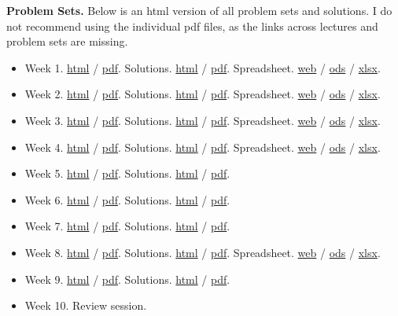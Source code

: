 \documentclass[]{book}
\providecommand{\tightlist}{%
  \setlength{\itemsep}{0pt}\setlength{\parskip}{0pt}}
\begin{document}
\textbf{Problem Sets.} Below is an html version of all problem sets and
solutions. I do not recommend using the individual pdf files, as the
links across lectures and problem sets are missing.

\begin{itemize}
\tightlist
\item
  Week 1. \href{pset1.html}{html} / \href{pset1.pdf}{pdf}. Solutions.
  \href{pset1-sol.html}{html} / \href{pset1-sol.pdf}{pdf}. Spreadsheet.
  \href{https://docs.google.com/spreadsheets/d/108I8xuosIQvgU6wOGrfwzHhE4p1OStgv8iIpzZ-4vME/edit?usp=sharing}{web}
  / \href{spreadsheets/pset1-sol.ods}{ods} /
  \href{spreadsheets/pset1-sol.xlsx}{xlsx}.
\item
  Week 2. \href{pset2.html}{html} / \href{pset2.pdf}{pdf}. Solutions.
  \href{pset2-sol.html}{html} / \href{pset2-sol.pdf}{pdf}. Spreadsheet.
  \href{https://docs.google.com/spreadsheets/d/1dkygwhDNT79cU_mTVXWal4RyGwX38OTnu5iS5UTz1fc/edit?usp=sharing}{web}
  / \href{spreadsheets/pset2-sol.ods}{ods} /
  \href{spreadsheets/pset2-sol.xlsx}{xlsx}.
\item
  Week 3. \href{pset3.html}{html} / \href{pset3.pdf}{pdf}. Solutions.
  \href{pset3-sol.html}{html} / \href{pset3-sol.pdf}{pdf}. Spreadsheet.
  \href{https://docs.google.com/spreadsheets/d/1dDFa5YZE5170Tv36klHQ19ykK2bP9wjeR0Y1_h-kacg/edit?usp=sharing}{web}
  / \href{spreadsheets/pset3-sol.ods}{ods} /
  \href{spreadsheets/pset3-sol.xlsx}{xlsx}.
\item
  Week 4. \href{pset4.html}{html} / \href{pset4.pdf}{pdf}. Solutions.
  \href{pset4-sol.html}{html} / \href{pset4-sol.pdf}{pdf}. Spreadsheet.
  \href{https://docs.google.com/spreadsheets/d/1h9JJD8K2_IE166gdj78waf0zu4YDY9Rp3r5oiJR_06s/edit?usp=sharing}{web}
  / \href{spreadsheets/pset4-sol.ods}{ods} /
  \href{spreadsheets/pset4-sol.xlsx}{xlsx}.
\item
  Week 5. \href{pset5.html}{html} / \href{pset5.pdf}{pdf}. Solutions.
  \href{pset5-sol.html}{html} / \href{pset5-sol.pdf}{pdf}.
\item
  Week 6. \href{pset6.html}{html} / \href{pset6.pdf}{pdf}. Solutions.
  \href{pset6-sol.html}{html} / \href{pset6-sol.pdf}{pdf}.
\item
  Week 7. \href{pset7.html}{html} / \href{pset7.pdf}{pdf}. Solutions.
  \href{pset7-sol.html}{html} / \href{pset7-sol.pdf}{pdf}.
\item
  Week 8. \href{pset8.html}{html} / \href{pset8.pdf}{pdf}. Solutions.
  \href{pset8-sol.html}{html} / \href{pset8-sol.pdf}{pdf}. Spreadsheet.
  \href{https://docs.google.com/spreadsheets/d/1faC3VTuXmo7wo4njkO2ERytzlJmbMgcckVj9ag_Mn6s/edit?usp=sharing}{web}
  / \href{spreadsheets/pset8-sol.ods}{ods} /
  \href{spreadsheets/pset8-sol.xlsx}{xlsx}.
\item
  Week 9. \href{pset9.html}{html} / \href{pset9.pdf}{pdf}. Solutions.
  \href{pset9-sol.html}{html} / \href{pset9-sol.pdf}{pdf}.
\item
  Week 10. Review session.
\end{itemize}
\end{document}
